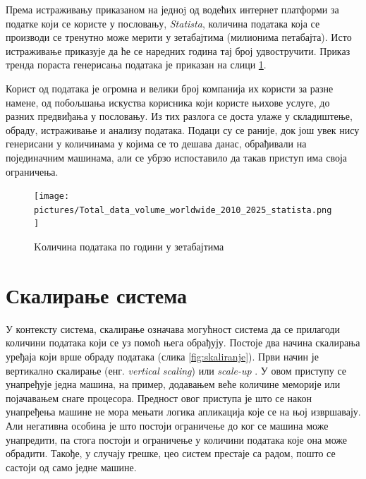 \documentclass[12pt,oneside]{memoir}
\begin{document}
Према истраживању \cite{volume_data} приказаном на једноj од водећих интернет платформи за податке који се користе у пословању, \textit{Statista}, количина података која се производи се тренутно може мерити у зетабајтима (милионима петабајта). Исто истраживање приказује да ће се наредних година тај број удвостручити. Приказ тренда пораста генерисања података је приказан на слици \ref{fig:kolicina_podataka}.

Корист од података је огромна и велики број компанија их користи за разне намене, од побољшања искуства корисника који користе њихове услуге, до разних предвиђања у пословању. Из тих разлога се доста улаже у складиштење, обраду, истраживање и анализу података. Подаци су се раније, док још увек нису генерисани у количинама у којима се то дешава данас, обрађивали на појединачним машинама, али се убрзо испоставило да такав приступ има своја ограничења.

\begin{figure}[!ht]
  \centering
  \texttt{[image: pictures/Total\_data\_volume\_worldwide\_2010\_2025\_statista.png]}
  \caption{Kоличина података по години у зетабајтима \cite{volume_data}}
  \label{fig:kolicina_podataka}
\end{figure}

\section{Скалирање система}
\label{sec:skaliranje}

У контексту система, скалирање означава могућност система да се прилагоди количини података који се уз помоћ њега обрађују. Постоје два начина скалирања уређаја који врше обраду података (слика \ref{fig:skaliranje}). Први начин је вертикално скалирање (енг. \textit{vertical scaling}) или \textit{scale-up} \cite{hadoop_beginner}. У овом приступу се унапређује једна машина, на пример, додавањем веће количине меморије или појачавањем снаге процесора. Предност овог приступа је што се након унапређења машине не мора мењати логика апликација које се на њој извршавају. Али негативна особина је што постоји ограничење до ког се машина може унапредити, па стога постоји и ограничење у количини података које она може обрадити. Такође, у случају грешке, цео систем престаје са радом, пошто се састоји од само једне машине.
\end{document}
